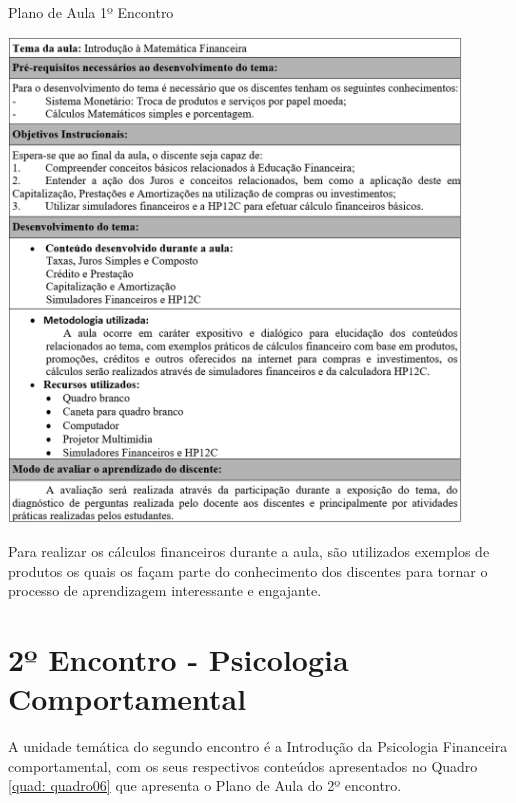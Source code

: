 \graphicspath{{quadros/}} 
\begin{quadro}[!ht]
\centering
\begin{minipage}{1.\textwidth}
\caption{Plano de Aula 1º Encontro}
\centering
\includegraphics[width=0.9\textwidth]{quadro-5_plano-aula-1}
\label{quad: quadro05}
\end{minipage}
\end{quadro}

Para realizar os cálculos financeiros durante a aula, são utilizados exemplos de produtos os quais os façam parte do conhecimento dos discentes para tornar o processo de aprendizagem interessante e engajante.

\section{2º Encontro - Psicologia Comportamental}
A unidade temática do segundo encontro é a Introdução da Psicologia Financeira comportamental, com os seus respectivos conteúdos apresentados no Quadro \ref{quad: quadro06} que apresenta o Plano de Aula do 2º encontro.

\newpage

